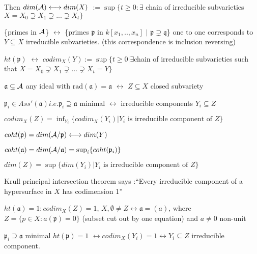 \documentclass[11pt]{article}
\newcommand{\sca}{{\mathfrak a}}
\newcommand{\scp}{{\mathfrak p}}
\newcommand{\scq}{\mathfrak q}
\newcommand{\cala}{{\cal A}}
\newcommand{\llrta}{\longleftrightarrow}
\begin{document}
Then $dim(\cala)\llrta dim(X)$ $:=\sup\{t\geq 0:\exists$ chain of irreducible subvarieties $ X=X_0\supsetneq X_1\supsetneq ...\supsetneq X_t\}$

\{primes in $\cala$\} $\llrta$ \{primes $\scp$ in $k[x_1,..,x_n]$ $|$ $\scp\supsetneq \scq$\} one to one corresponds to $Y\subseteq X$ irreducible subvarieties. (this correspondence is inclusion reversing)

$ht(\scp)$ $\llrta$ $codim_X(Y):=\sup\{t\geq 0|\exists $chain of irreducible subvarieties such that $X=X_0\supsetneq X_1\supsetneq ...\supsetneq X_t=Y\}$

$\sca\subseteq\cala$ any ideal with $\text{rad}(\sca)=\sca $ $\llrta$ $Z\subseteq X$ closed subvariety

$\scp_i\in Ass'(\sca) i.e. \scp_i\supseteq \sca$ minimal $\llrta$ irreducible components $Y_i\subseteq Z$

$codim_X(Z)=\inf_{Y_i}\{ codim_X(Y_i)| \text{$Y_i$ is irreducible component of $Z$}\}$

$coht(\scp)=dim(\cala/\scp)\llrta dim(Y)$

$coht(\sca)=dim(\cala/\sca)=\sup_i \{coht(\scp_i)\}$

$dim(Z)=\sup\{ dim(Y_i)| Y_i\text{ is irreducible component of $Z$}\}$

Krull principal intersection theorem says :``Every irreducible component of a hypersurface in $X$ has codimension 1''

$ht(\sca)=1:codim_X(Z)=1$, $X,\emptyset\neq Z\llrta\sca=(a)$, where $Z=\{p\in X:a(\scp)=0\}$ (subset cut out by one equation) and $a\neq 0\text{ non-unit}$

$\scp_i\supseteq \sca$ minimal $ht(\scp)=1$ $\llrta codim_X(Y_i)=1\llrta Y_i\subseteq Z$ irreducible component.
\end{document}
